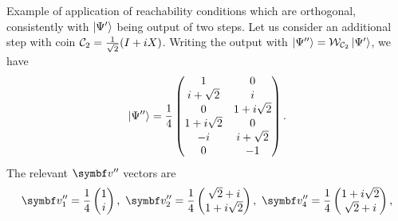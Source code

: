 \begin{examplebox}[label=ex:QWs:conditions_few_steps]{Example of application of reachability conditions}
    which are orthogonal, consistently with $\ket{\Psi'}$ being output of two steps.
    Let us consider an additional step with coin ${\mathcal{C}}_2=\frac{1}{\sqrt2}(I + iX)$.
    Writing the output with $\ket{\Psi''}={\mathcal{W}}_{{\mathcal{C}}_2}\ket{\Psi'}$, we have
    \begin{equation}
        \ket{\Psi''} = \frac{1}{4}
        \begin{pmatrix}
            1 & 0 \\
            i + \sqrt2 & i \\
            0 & 1 + i\sqrt2 \\
            1 + i\sqrt2 & 0 \\
            -i & i + \sqrt2 \\
            0 & -1
        \end{pmatrix}.
    \end{equation}
    The relevant $\bs v''$ vectors are
    \begin{equation}
    \begin{aligned}
        \bs v''_1 = \frac{1}{4}\begin{pmatrix} 1 \\ i \end{pmatrix},
        \,\,
        \bs v''_2 = \frac{1}{4}\begin{pmatrix} \sqrt2 + i \\ 1 + i\sqrt2 \end{pmatrix},
        \,\,
        \bs v''_4 = \frac{1}{4}\begin{pmatrix} 1 + i\sqrt2\\ \sqrt2 + i \end{pmatrix},

\end{aligned}
\end{equation}
\end{examplebox}
